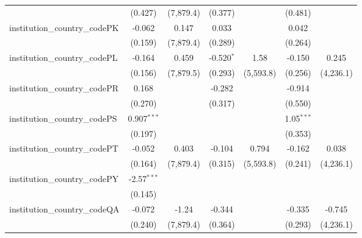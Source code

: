 \begin{tabular}{lcccccc}
                                         & (0.427)        & (7,879.4)     & (0.377)        &               & (0.481)        &   \\   
   institution\_country\_codePK          & -0.062         & 0.147         & 0.033          &               & 0.042          &   \\   
                                         & (0.159)        & (7,879.4)     & (0.289)        &               & (0.264)        &   \\   
   institution\_country\_codePL          & -0.164         & 0.459         & -0.520$^{*}$   & 1.58          & -0.150         & 0.245\\   
                                         & (0.156)        & (7,879.5)     & (0.293)        & (5,593.8)     & (0.256)        & (4,236.1)\\   
   institution\_country\_codePR          & 0.168          &               & -0.282         &               & -0.914         &   \\   
                                         & (0.270)        &               & (0.317)        &               & (0.550)        &   \\   
   institution\_country\_codePS          & 0.907$^{***}$  &               &                &               & 1.05$^{***}$   &   \\   
                                         & (0.197)        &               &                &               & (0.353)        &   \\   
   institution\_country\_codePT          & -0.052         & 0.403         & -0.104         & 0.794         & -0.162         & 0.038\\   
                                         & (0.164)        & (7,879.4)     & (0.315)        & (5,593.8)     & (0.241)        & (4,236.1)\\   
   institution\_country\_codePY          & -2.57$^{***}$  &               &                &               &                &   \\   
                                         & (0.145)        &               &                &               &                &   \\   
   institution\_country\_codeQA          & -0.072         & -1.24         & -0.344         &               & -0.335         & -0.745\\   
                                         & (0.240)        & (7,879.4)     & (0.364)        &               & (0.293)        & (4,236.1)\\   

\end{tabular}
